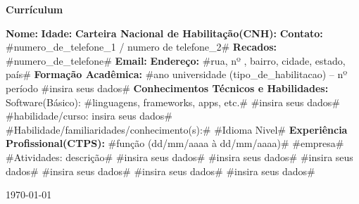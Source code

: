 \documentclass[a4paper,10pt]{report}
\begin{document}
\pagestyle{empty}
\begin{flushleft}
\begin{center}
\huge 
\textbf{Currículum}
\linebreak
\end{center}
  \textbf{Nome:} 
  \linebreak
  \textbf{Idade:} 
  \textbf{Carteira Nacional de Habilitação(CNH):}
  \linebreak
  \textbf{Contato:} #numero_de_telefone_1 / numero de telefone_2# 
  \textbf{Recados:} #numero_de_telefone#
  \linebreak
  \textbf{ Email:} 
  \textbf{Endereço:} #rua, nº , bairro, cidade, estado, país#
  \linebreak
  \linebreak
  \textbf{Formação Acadêmica:}
  \linebreak
  \linebreak
  #ano universidade (tipo_de_habilitacao) – nº período
  \linebreak
  \linebreak
  #insira seus dados#
  \linebreak
  \linebreak
  \textbf{Conhecimentos Técnicos e Habilidades:}
  \linebreak
  \linebreak
  Software(Básico): #linguagens, frameworks, apps, etc.#
  \linebreak
  #insira seus dados#
  \linebreak
  #habilidade/curso: insira seus dados#
  \linebreak
  #Habilidade/familiaridades/conhecimento(s):#
  \linebreak
  #Idioma Nivel#
  \linebreak
  \linebreak
  \textbf{Experiência Profissional(CTPS):}
  \linebreak
  \linebreak
  #função (dd/mm/aaaa à dd/mm/aaaa)#
  \linebreak
  #empresa#
  \linebreak
  #Atividades: descrição#
  \linebreak
  \linebreak
  #insira seus dados#
  \linebreak
  #insira seus dados#
  \linebreak
  #insira seus dados#
  \linebreak
  \linebreak
  #insira seus dados#
  \linebreak
  #insira seus dados#
  \linebreak
  #insira seus dados#
\vspace*{5\baselineskip}
  \begin{center}
\today
\end{center}
\end{flushleft}
\end{document}
